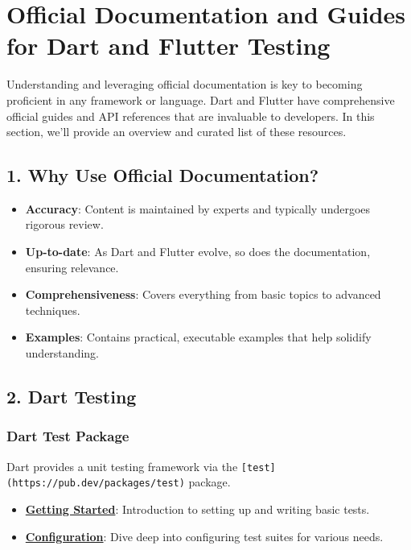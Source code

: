 \documentclass[
]{article}
\providecommand{\tightlist}{%
  \setlength{\itemsep}{0pt}\setlength{\parskip}{0pt}}
\begin{document}
\section{Official Documentation and Guides for Dart and Flutter
Testing}\label{official-documentation-and-guides-for-dart-and-flutter-testing}

Understanding and leveraging official documentation is key to becoming
proficient in any framework or language. Dart and Flutter have
comprehensive official guides and API references that are invaluable to
developers. In this section, we'll provide an overview and curated list
of these resources.

\subsection{1. Why Use Official
Documentation?}\label{why-use-official-documentation}

\begin{itemize}
\tightlist
\item
  \textbf{Accuracy}: Content is maintained by experts and typically
  undergoes rigorous review.
\item
  \textbf{Up-to-date}: As Dart and Flutter evolve, so does the
  documentation, ensuring relevance.
\item
  \textbf{Comprehensiveness}: Covers everything from basic topics to
  advanced techniques.
\item
  \textbf{Examples}: Contains practical, executable examples that help
  solidify understanding.
\end{itemize}

\subsection{2. Dart Testing}\label{dart-testing}

\subsubsection{Dart Test Package}\label{dart-test-package}

Dart provides a unit testing framework via the
\texttt{{[}test{]}(https://pub.dev/packages/test)} package.

\begin{itemize}
\tightlist
\item
  \href{https://pub.dev/packages/test\#-readme-tab-}{\textbf{Getting
  Started}}: Introduction to setting up and writing basic tests.
\item
  \href{https://github.com/dart-lang/test/blob/master/pkgs/test/doc/configuration.md}{\textbf{Configuration}}:
  Dive deep into configuring test suites for various needs.
\end{itemize}
\end{document}
